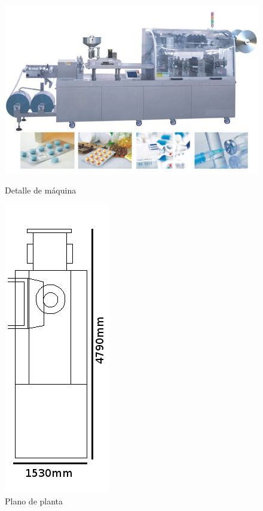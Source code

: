	\begin{figure}[htp]
		\begin{minipage}{.48\textwidth}
			\centering
			\includegraphics[scale=0.4]{Datasheets/5Foto.png}
			\caption{Detalle de máquina}
			\label{fig:testa}
		\end{minipage}
		\begin{minipage}{.48\textwidth}
			\centering
			\includegraphics[scale=0.4]{Datasheets/Miniaturas/blister.png}
			\caption{Plano de planta}
			\label{fig:testb}
		\end{minipage}
	\end{figure}
	
